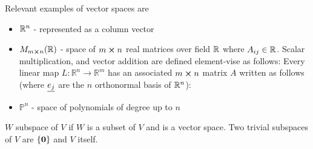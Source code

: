 Relevant examples of vector spaces are
\begin{itemize}
    \item $\mathbb{R}^n$ - represented as a column vector
    \item $M_{m\cross n}(\mathbb{R})$ - space of $m\cross n$ real matrices over field $\mathbb{R}$
    where $A_{ij}\in\mathbb{R}$. Scalar multiplication, and vector addition are defined element-vise as follows:
    Every linear map $L:\mathbb{R}^n\rightarrow\mathbb{R}^m$ has an associated $m\cross n$ matrix $A$ written as follows (where $\underline{e_j}$ are the $n$ orthonormal basis of $\mathbb{R}^n$):
    \item $\mathbb{P}^n$ - space of polynomials of degree up to $n$
\end{itemize}

\begin{definition}
    $W$ subspace of $V$ if $W$ is a subset of $V$ and is a vector space. Two trivial subspaces of $V$ are $\{\boldsymbol{0}\}$ and $V$ itself.
\end{definition}


